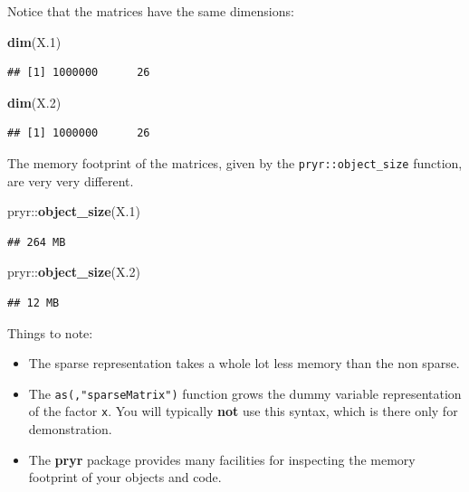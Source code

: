 \documentclass[]{book}
\newenvironment{Shaded}{\begin{snugshade}}{\end{snugshade}}
\newcommand{\KeywordTok}[1]{\textcolor[rgb]{0.13,0.29,0.53}{\textbf{{#1}}}}
\newcommand{\FloatTok}[1]{\textcolor[rgb]{0.00,0.00,0.81}{{#1}}}
\newcommand{\NormalTok}[1]{{#1}}
\providecommand{\tightlist}{%
  \setlength{\itemsep}{0pt}\setlength{\parskip}{0pt}}
\theoremstyle{definition}
\theoremstyle{definition}
\theoremstyle{remark}
\begin{document}
Notice that the matrices have the same dimensions:

\begin{Shaded}
\begin{Highlighting}[]
\KeywordTok{dim}\NormalTok{(X}\FloatTok{.1}\NormalTok{)}
\end{Highlighting}
\end{Shaded}

\begin{verbatim}
## [1] 1000000      26
\end{verbatim}

\begin{Shaded}
\begin{Highlighting}[]
\KeywordTok{dim}\NormalTok{(X}\FloatTok{.2}\NormalTok{)}
\end{Highlighting}
\end{Shaded}

\begin{verbatim}
## [1] 1000000      26
\end{verbatim}

The memory footprint of the matrices, given by the
\texttt{pryr::object\_size} function, are very very different.

\begin{Shaded}
\begin{Highlighting}[]
\NormalTok{pryr::}\KeywordTok{object_size}\NormalTok{(X}\FloatTok{.1}\NormalTok{)}
\end{Highlighting}
\end{Shaded}

\begin{verbatim}
## 264 MB
\end{verbatim}

\begin{Shaded}
\begin{Highlighting}[]
\NormalTok{pryr::}\KeywordTok{object_size}\NormalTok{(X}\FloatTok{.2}\NormalTok{)}
\end{Highlighting}
\end{Shaded}

\begin{verbatim}
## 12 MB
\end{verbatim}

Things to note:

\begin{itemize}
\tightlist
\item
  The sparse representation takes a whole lot less memory than the non
  sparse.
\item
  The \texttt{as(,"sparseMatrix")} function grows the dummy variable
  representation of the factor \texttt{x}. You will typically
  \textbf{not} use this syntax, which is there only for demonstration.
\item
  The \textbf{pryr} package provides many facilities for inspecting the
  memory footprint of your objects and code.
\end{itemize}
\end{document}

